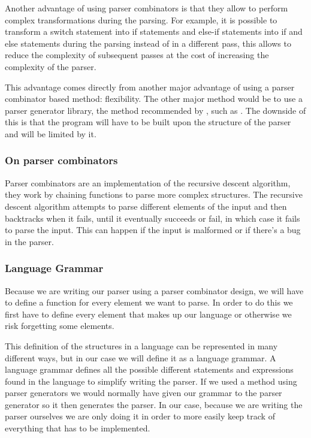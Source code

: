\documentclass{article}
\begin{document}
Another advantage of using parser combinators is that they allow to perform
complex transformations during the parsing. For example, it is possible to
transform a switch statement into if statements and else-if statements into
if and else statements during the parsing instead of in a different pass, this
allows to reduce the complexity of subsequent passes at the cost of increasing
the complexity of the parser.

This advantage comes directly from another major advantage of using a parser
combinator based method: flexibility. The other major method would be to use a
parser generator library, the method recommended by \textcite{eopl}, such as
\textcite{bison}. The downside of this is that the program will have to be
built upon the structure of the parser and will be limited by it.

\subsubsection{On parser combinators}

Parser combinators are an implementation of the recursive descent algorithm,
they work by chaining functions to parse more complex structures. The recursive
descent algorithm attempts to parse different elements of the input and then
backtracks when it fails, until it eventually succeeds or fail, in which case
it fails to parse the input. This can happen if the input is malformed or if
there's a bug in the parser.

\subsubsection{Language Grammar}

Because we are writing our parser using a parser combinator design, we will
have to define a function for every element we want to parse. In order to do
this we first have to define every element that makes up our language or
otherwise we risk forgetting some elements.

This definition of the structures in a language can be represented in many
different ways, but in our case we will define it as a language grammar. A
language grammar defines all the possible different statements and expressions
found in the language to simplify writing the parser. If we used a method using
parser generators we would normally have given our grammar to the parser
generator so it then generates the parser. In our case, because we are writing
the parser ourselves we are only doing it in order to more easily keep track of
everything that has to be implemented.
\end{document}
